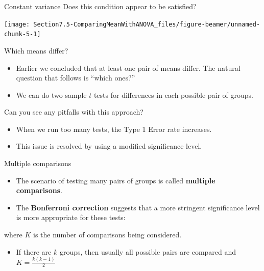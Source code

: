 \documentclass[
  ignorenonframetext,
]{beamer}
\providecommand{\tightlist}{%
  \setlength{\itemsep}{0pt}\setlength{\parskip}{0pt}}
\begin{document}
\begin{frame}{Constant variance}
\protect\hypertarget{constant-variance}{}
\alert{Does this condition appear to be satisfied?}

\begin{center}\texttt{[image: Section7.5-ComparingMeanWithANOVA\_files/figure-beamer/unnamed-chunk-5-1]} \end{center}
\end{frame}

\begin{frame}{Which means differ?}
\protect\hypertarget{which-means-differ}{}
\begin{itemize}
\tightlist
\item
  Earlier we concluded that at least one pair of means differ. The
  natural question that follows is ``which ones?''
\end{itemize}

\pause

\begin{itemize}
\tightlist
\item
  We can do two sample \(t\) tests for differences in each possible pair
  of groups.
\end{itemize}

\pause

\alert{Can you see any pitfalls with this approach?}

\pause

\begin{itemize}
\item
  When we run too many tests, the Type 1 Error rate increases.
\item
  This issue is resolved by using a modified significance level.
\end{itemize}
\end{frame}

\begin{frame}{Multiple comparisons}
\protect\hypertarget{multiple-comparisons}{}
\begin{itemize}
\tightlist
\item
  The scenario of testing many pairs of groups is called
  \textbf{multiple comparisons}.
\end{itemize}

\pause

\begin{itemize}
\tightlist
\item
  The \textbf{Bonferroni correction} suggests that a more
  \alert{stringent} significance level is more appropriate for these
  tests:
\end{itemize}


\raggedright where \(K\) is the number of comparisons being considered.

\pause

\begin{itemize}
\tightlist
\item
  If there are \(k\) groups, then usually all possible pairs are
  compared and \(K = \frac{k(k-1)}{2}\)
\end{itemize}
\end{frame}
\end{document}

